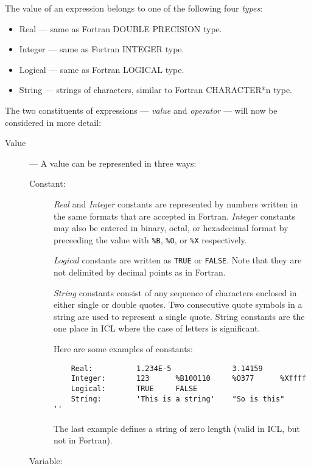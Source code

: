 The value of an expression belongs to one of the following four
{\em types}:
\begin{itemize}
\item Real --- same as Fortran DOUBLE PRECISION type.
\item Integer --- same as Fortran INTEGER type.
\item Logical --- same as Fortran LOGICAL type.
\item String --- strings of characters, similar to Fortran CHARACTER*n type.
\end{itemize}
The two constituents of expressions --- {\em value} and {\em operator} --- will
now be considered in more detail:
\begin{description}
\item [Value] ---
A value can be represented in three ways:
\begin{description}
\item[Constant:] \mbox{}

{\em Real} and {\em Integer} constants are represented by numbers written in
the same formats that are accepted in Fortran.
{\em Integer} constants may also be entered in binary, octal, or hexadecimal
format by preceeding the value with \verb+%B+, \verb+%O+, or \verb+%X+
respectively.

{\em Logical} constants are written as \verb+TRUE+ or \verb+FALSE+.
Note that they are not delimited by decimal points as in Fortran.

{\em String} constants consist of any sequence of characters enclosed in either
single or double quotes.
Two consecutive quote symbols in a string are used to represent a single quote.
String constants are the one place in ICL where the case of letters is
significant.

Here are some examples of constants:

\begin{small}
\begin{verbatim}
    Real:          1.234E-5              3.14159 
    Integer:       123      %B100110     %O377      %Xffff
    Logical:       TRUE     FALSE
    String:        'This is a string'    "So is this"      ''
\end{verbatim}
\end{small}

The last example defines a string of zero length (valid in ICL, but not in
Fortran).

\item[Variable:] \mbox{}


\end{description}
\end{description}
